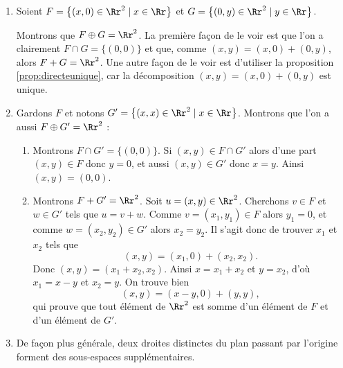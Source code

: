 \documentclass[class=report,crop=false]{standalone}
\begin{document}
\begin{exemple}
\sauteligne
\begin{enumerate}
  \item Soient $F = \big\{ (x,0) \in \Rr^2 \mid x \in \Rr \big\}$
et $G = \big\{ (0,y) \in \Rr^2 \mid y \in \Rr \big\}$.

Montrons que $F \oplus G = \Rr^2$.
La première façon de le voir est que l'on a clairement $F\cap G = \{ (0,0) \}$
et que, comme $(x,y)=(x,0)+(0,y)$, alors $F+G = \Rr^2$.
Une autre façon de le voir est d'utiliser la proposition \ref{prop:directeunique},
car la décomposition $(x,y)=(x,0)+(0,y)$ est unique.


  \item Gardons $F$ et notons $G' = \big\{ (x,x) \in \Rr^2 \mid x \in \Rr \big\}$.
Montrons que l'on a aussi $F\oplus G'=\Rr^2$ :
  \begin{enumerate}
    \item Montrons $F \cap G' =\{(0,0)\}$. Si $(x,y) \in F \cap G'$ alors
    d'une part $(x,y) \in F$ donc $y=0$, et aussi $(x,y) \in G'$ donc $x=y$. Ainsi
    $(x,y)=(0,0)$.

    \item Montrons $F+G' = \Rr^2$. Soit $u=(x,y) \in \Rr^2$.
Cherchons $v \in F$ et $w \in G'$ tels que $u=v+w$.
Comme $v = (x_1,y_1) \in F$ alors $y_1 = 0$, et comme
$w = (x_2,y_2) \in G'$ alors $x_2=y_2$. Il s'agit donc de trouver
$x_1$ et $x_2$ tels que
$$(x,y)= (x_1,0)+(x_2,x_2).$$
Donc $(x,y)=(x_1+x_2,x_2)$. Ainsi $x=x_1+x_2$ et $y=x_2$, d'où $x_1 = x-y$ et $x_2=y$.
On trouve bien
$$(x,y) = (x-y,0) + (y,y),$$
qui prouve que tout élément de $\Rr^2$ est somme d'un élément de $F$ et d'un élément de $G'$.
  \end{enumerate}

  \item De façon plus générale, deux droites distinctes du plan
  passant par l'origine forment des sous-espaces supplémentaires.
\end{enumerate}
\end{exemple}
\end{document}
